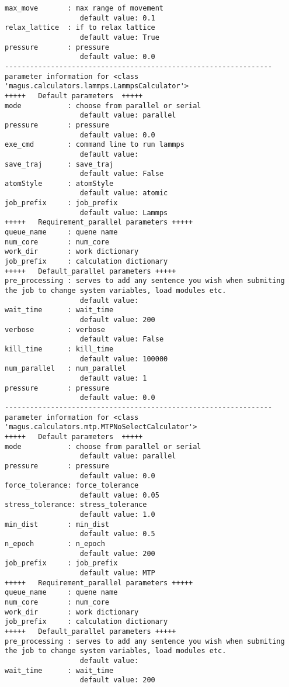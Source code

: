 \documentclass[12pt,oneside]{book}
\begin{document}
\begin{tcolorbox}
\begin{verbatim}
max_move       : max range of movement
                  default value: 0.1
relax_lattice  : if to relax lattice
                  default value: True
pressure       : pressure
                  default value: 0.0
----------------------------------------------------------------
parameter information for <class 'magus.calculators.lammps.LammpsCalculator'>
+++++	Default parameters	+++++
mode           : choose from parallel or serial
                  default value: parallel
pressure       : pressure
                  default value: 0.0
exe_cmd        : command line to run lammps
                  default value: 
save_traj      : save_traj
                  default value: False
atomStyle      : atomStyle
                  default value: atomic
job_prefix     : job_prefix
                  default value: Lammps
+++++	Requirement_parallel parameters	+++++
queue_name     : quene name
num_core       : num_core
work_dir       : work dictionary
job_prefix     : calculation dictionary
+++++	Default_parallel parameters	+++++
pre_processing : serves to add any sentence you wish when submiting the job to change system variables, load modules etc.
                  default value: 
wait_time      : wait_time
                  default value: 200
verbose        : verbose
                  default value: False
kill_time      : kill_time
                  default value: 100000
num_parallel   : num_parallel
                  default value: 1
pressure       : pressure
                  default value: 0.0
----------------------------------------------------------------
parameter information for <class 'magus.calculators.mtp.MTPNoSelectCalculator'>
+++++	Default parameters	+++++
mode           : choose from parallel or serial
                  default value: parallel
pressure       : pressure
                  default value: 0.0
force_tolerance: force_tolerance
                  default value: 0.05
stress_tolerance: stress_tolerance
                  default value: 1.0
min_dist       : min_dist
                  default value: 0.5
n_epoch        : n_epoch
                  default value: 200
job_prefix     : job_prefix
                  default value: MTP
+++++	Requirement_parallel parameters	+++++
queue_name     : quene name
num_core       : num_core
work_dir       : work dictionary
job_prefix     : calculation dictionary
+++++	Default_parallel parameters	+++++
pre_processing : serves to add any sentence you wish when submiting the job to change system variables, load modules etc.
                  default value: 
wait_time      : wait_time
                  default value: 200

\end{verbatim}
\end{tcolorbox}
\end{document}
